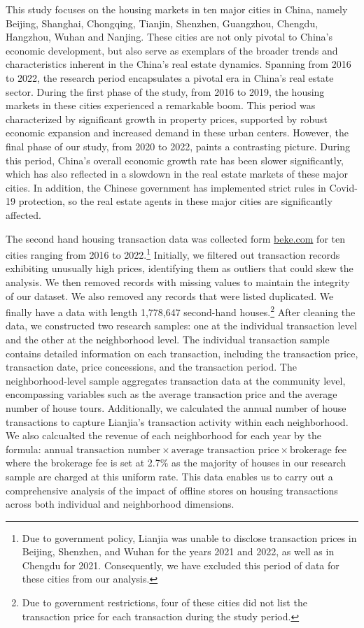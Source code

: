 \documentclass[11pt]{article}
\begin{document}
This study focuses on the housing markets in ten major cities in China, namely Beijing, Shanghai, Chongqing, Tianjin, Shenzhen, Guangzhou, Chengdu, Hangzhou, Wuhan and Nanjing. These cities are not only pivotal to China's economic development, but also serve as exemplars of the broader trends and characteristics inherent in the China's real estate dynamics. Spanning from 2016 to 2022, the research period encapsulates a pivotal era in China's real estate sector. During the first phase of the study, from 2016 to 2019, the housing markets in these cities experienced a remarkable boom. This period was characterized by significant growth in property prices, supported by robust economic expansion and increased demand in these urban centers. However, the final phase of our study, from 2020 to 2022, paints a contrasting picture. During this period, China's overall economic growth rate has been slower significantly, which has also reflected in a slowdown in the real estate markets of these major cities. In addition, the Chinese government has implemented strict rules in Covid-19 protection, so the real estate agents in these major cities are significantly affected.

The second hand housing transaction data was collected form \href{https://www.ke.com/city/}{beke.com} for ten cities ranging from 2016 to 2022.\footnote{Due to government policy, Lianjia was unable to disclose transaction prices in Beijing, Shenzhen, and Wuhan for the years 2021 and 2022, as well as in Chengdu for 2021. Consequently, we have excluded this period of data for these cities from our analysis.} Initially, we filtered out transaction records exhibiting unusually high prices, identifying them as outliers that could skew the analysis. We then removed records with missing values to maintain the integrity of our dataset. We also removed any records that were listed duplicated. We finally have a data with length 1,778,647 second-hand houses.\footnote{Due to government restrictions, four of these cities did not list the transaction price for each transaction during the study period.} After cleaning the data, we constructed two research samples: one at the individual transaction level and the other at the neighborhood level. The individual transaction sample contains detailed information on each transaction, including the transaction price, transaction date, price concessions, and the transaction period. The neighborhood-level sample aggregates transaction data at the community level, encompassing variables such as the average transaction price and the average number of house tours. Additionally, we calculated the annual number of house transactions to capture Lianjia's transaction activity within each neighborhood. We also calcualted the revenue of each neighborhood for each year by the formula: $\text{annual transaction number} \times \text{average transaction price} \times \text{brokerage fee}$ where the brokerage fee is set at 2.7\% as the majority of houses in our research sample are charged at this uniform rate. This data enables us to carry out a comprehensive analysis of the impact of offline stores on housing transactions across both individual and neighborhood dimensions.
\end{document}
